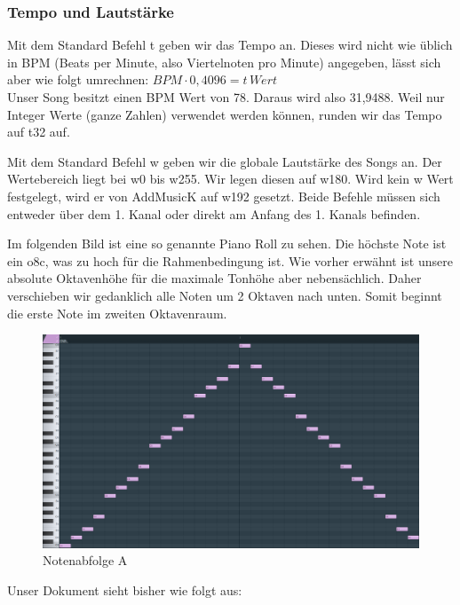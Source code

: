 \subsubsection{Tempo und Lautstärke}
Mit dem Standard Befehl t geben wir das Tempo an. Dieses wird nicht wie üblich in BPM (Beats per Minute, also Viertelnoten pro Minute) angegeben, lässt sich aber wie folgt umrechnen: $ BPM \cdot 0,4096 = t \, Wert $ \\
Unser Song besitzt einen BPM Wert von 78. Daraus wird also 31,9488. Weil nur Integer Werte (ganze Zahlen) verwendet werden können, runden wir das Tempo auf t32 auf.

\bigskip

Mit dem Standard Befehl w geben wir die globale Lautstärke des Songs an. Der Wertebereich liegt bei w0 bis w255. Wir legen diesen auf w180. Wird kein w Wert festgelegt, wird er von AddMusicK auf w192 gesetzt. Beide Befehle müssen sich entweder über dem 1. Kanal oder direkt am Anfang des 1. Kanals befinden.

\bigskip

Im folgenden Bild ist eine so genannte Piano Roll zu sehen. Die höchste Note ist ein o8c, was zu hoch für die Rahmenbedingung ist. Wie vorher erwähnt ist unsere absolute Oktavenhöhe für die maximale Tonhöhe aber nebensächlich. Daher verschieben wir gedanklich alle Noten um 2 Oktaven nach unten. Somit beginnt die erste Note im zweiten Oktavenraum. 

\begin{figure}[htbp] \centering
	\includegraphics[width=.95\linewidth]{images/Noten_A.png}
	\caption{Notenabfolge A}
	\label{NotenabfolgeA}
\end{figure}
Unser Dokument sieht bisher wie folgt aus:

\medskip



